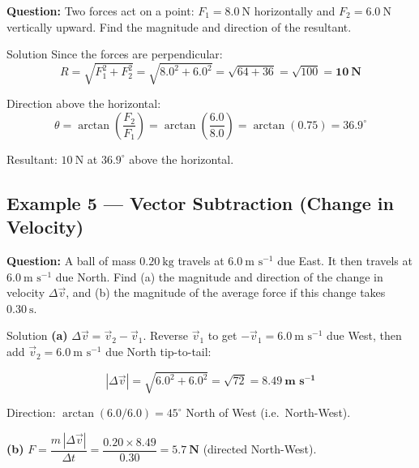 \textbf{Question:} Two forces act on a point: $F_1 = 8.0\ \text{N}$ horizontally and $F_2 = 6.0\ \text{N}$ vertically upward. Find the magnitude and direction of the resultant.

\begin{examplebox}{Solution}
Since the forces are perpendicular:
$$R = \sqrt{F_1^2 + F_2^2} = \sqrt{8.0^2 + 6.0^2} = \sqrt{64 + 36} = \sqrt{100} = \mathbf{10\ \text{N}}$$

Direction above the horizontal:
$$\theta = \arctan\!\left(\frac{F_2}{F_1}\right) = \arctan\!\left(\frac{6.0}{8.0}\right) = \arctan(0.75) = \mathbf{36.9^\circ}$$

Resultant: $10\ \text{N}$ at $36.9^\circ$ above the horizontal.
\end{examplebox}

\subsection*{Example 5 --- Vector Subtraction (Change in Velocity)}

\textbf{Question:} A ball of mass $0.20\ \text{kg}$ travels at $6.0\ \text{m s}^{-1}$ due East. It then travels at $6.0\ \text{m s}^{-1}$ due North. Find (a) the magnitude and direction of the change in velocity $\Delta\vec{v}$, and (b) the magnitude of the average force if this change takes $0.30\ \text{s}$.

\begin{examplebox}{Solution}
\textbf{(a)} $\Delta\vec{v} = \vec{v}_2 - \vec{v}_1$. Reverse $\vec{v}_1$ to get $-\vec{v}_1 = 6.0\ \text{m s}^{-1}$ due West, then add $\vec{v}_2 = 6.0\ \text{m s}^{-1}$ due North tip-to-tail:

\begin{center}
\end{center}

$$|\Delta\vec{v}| = \sqrt{6.0^2 + 6.0^2} = \sqrt{72} = \mathbf{8.49\ \text{m s}^{-1}}$$

Direction: $\arctan(6.0/6.0) = 45^\circ$ North of West (i.e.\ North-West).

\vspace{0.3em}
\textbf{(b)} $F = \dfrac{m\,|\Delta\vec{v}|}{\Delta t} = \dfrac{0.20 \times 8.49}{0.30} = \mathbf{5.7\ \text{N}}$ (directed North-West).
\end{examplebox}

